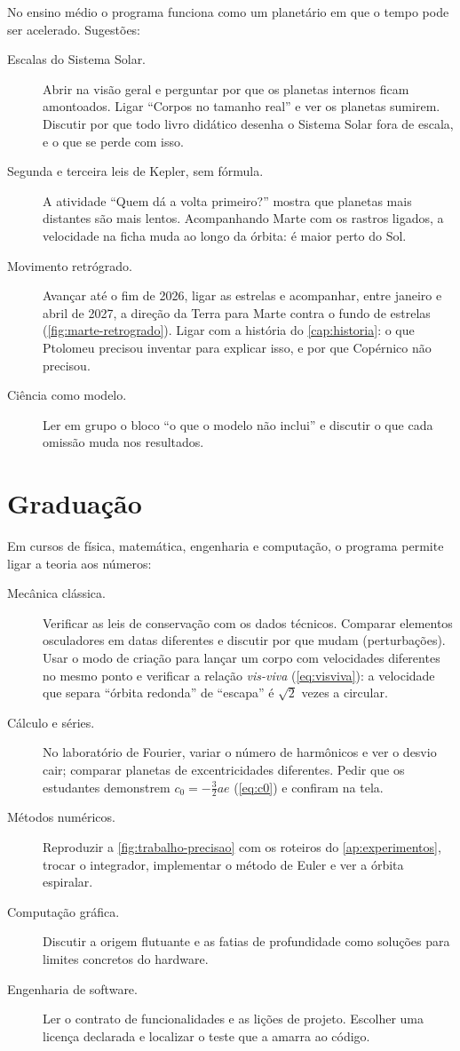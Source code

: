 No ensino médio o programa funciona como um planetário em que o tempo pode ser acelerado. Sugestões:

\begin{description}
  \item[Escalas do Sistema Solar.] Abrir na visão geral e perguntar por que os planetas internos ficam amontoados. Ligar ``Corpos no tamanho real'' e ver os planetas sumirem. Discutir por que todo livro didático desenha o Sistema Solar fora de escala, e o que se perde com isso.
  \item[Segunda e terceira leis de Kepler, sem fórmula.] A atividade ``Quem dá a volta primeiro?'' mostra que planetas mais distantes são mais lentos. Acompanhando Marte com os rastros ligados, a velocidade na ficha muda ao longo da órbita: é maior perto do Sol.
  \item[Movimento retrógrado.] Avançar até o fim de 2026, ligar as estrelas e acompanhar, entre janeiro e abril de 2027, a direção da Terra para Marte contra o fundo de estrelas (\autoref{fig:marte-retrogrado}). Ligar com a história do \autoref{cap:historia}: o que Ptolomeu precisou inventar para explicar isso, e por que Copérnico não precisou.
  \item[Ciência como modelo.] Ler em grupo o bloco ``o que o modelo não inclui'' e discutir o que cada omissão muda nos resultados.
\end{description}

\section{Graduação}

Em cursos de física, matemática, engenharia e computação, o programa permite ligar a teoria aos números:

\begin{description}
  \item[Mecânica clássica.] Verificar as leis de conservação com os dados técnicos. Comparar elementos osculadores em datas diferentes e discutir por que mudam (perturbações). Usar o modo de criação para lançar um corpo com velocidades diferentes no mesmo ponto e verificar a relação \emph{vis-viva} (\autoref{eq:visviva}): a velocidade que separa ``órbita redonda'' de ``escapa'' é $\sqrt{2}$ vezes a circular.
  \item[Cálculo e séries.] No laboratório de Fourier, variar o número de harmônicos e ver o desvio cair; comparar planetas de excentricidades diferentes. Pedir que os estudantes demonstrem $c_0 = -\frac32 ae$ (\autoref{eq:c0}) e confiram na tela.
  \item[Métodos numéricos.] Reproduzir a \autoref{fig:trabalho-precisao} com os roteiros do \autoref{ap:experimentos}, trocar o integrador, implementar o método de Euler e ver a órbita espiralar.
  \item[Computação gráfica.] Discutir a origem flutuante e as fatias de profundidade como soluções para limites concretos do hardware.
  \item[Engenharia de software.] Ler o contrato de funcionalidades e as lições de projeto. Escolher uma licença declarada e localizar o teste que a amarra ao código.
\end{description}

